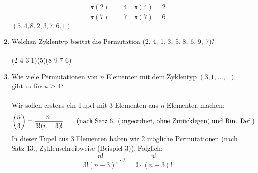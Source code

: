 \begin{enumerate}[label=(\alph*)]
\begin{align*}
        	\pi(2) &=4 \quad \pi(4)=2\\
        	\pi(7) &=7 \quad \pi(7)=6
        \end{align*}
        $(5, 4,8,2,3,7,6,1)$
        \item Welchen Zyklentyp besitzt die Permutation (2, 4, 1, 3, 5, 8, 6, 9, 7)?\\\\
        (2 4 3 1)(5)(8 9 7 6)
        \item Wie viele Permutationen von $n$ Elementen mit dem Zyklentyp 
        $(3, 1, \ldots, 1)$ gibt es für $n \geq 4$?\\\\
        Wir sollen erstens ein Tupel mit 3 Elementen aus $n$ Elementen machen: 
        \[\binom{n}{3} = \frac{n!}{3!(n-3)!} 
        \textrm{\qquad(nach Satz 6. (ungeordnet, ohne Zur\"ucklegen) und Bin. Def.)}\]
        In dieser Tupel aus 3 Elementen haben wir 2 m\"ogliche Permutationen 
        (nach Satz 13., Zyklenschreibweise (Beispiel 3)). Folglich:
        \[\frac{n!}{3!(n-3)!} \cdot 2 = \frac{n!}{3\cdot(n-3)!}\]
    \end{enumerate}
